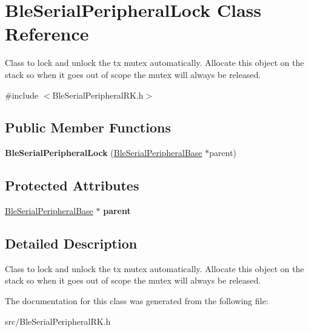 \hypertarget{class_ble_serial_peripheral_lock}{}\section{Ble\+Serial\+Peripheral\+Lock Class Reference}
\label{class_ble_serial_peripheral_lock}


Class to lock and unlock the tx mutex automatically. Allocate this object on the stack so when it goes out of scope the mutex will always be released.  




{\ttfamily \#include $<$Ble\+Serial\+Peripheral\+R\+K.\+h$>$}

\subsection*{Public Member Functions}
\begin{DoxyCompactItemize}
\item 
\mbox{\label{class_ble_serial_peripheral_lock_af087b1f0c3a1ec5f0717bea4f9ab297a}} 
{\bfseries Ble\+Serial\+Peripheral\+Lock} (\mbox{\hyperlink{class_ble_serial_peripheral_base}{Ble\+Serial\+Peripheral\+Base}} $\ast$parent)
\end{DoxyCompactItemize}
\subsection*{Protected Attributes}
\begin{DoxyCompactItemize}
\item 
\mbox{\label{class_ble_serial_peripheral_lock_a770b9c16380ab8da597a4e229d28c3a7}} 
\mbox{\hyperlink{class_ble_serial_peripheral_base}{Ble\+Serial\+Peripheral\+Base}} $\ast$ {\bfseries parent}
\end{DoxyCompactItemize}


\subsection{Detailed Description}
Class to lock and unlock the tx mutex automatically. Allocate this object on the stack so when it goes out of scope the mutex will always be released. 

The documentation for this class was generated from the following file\+:\begin{DoxyCompactItemize}
\item 
src/Ble\+Serial\+Peripheral\+R\+K.\+h\end{DoxyCompactItemize}
